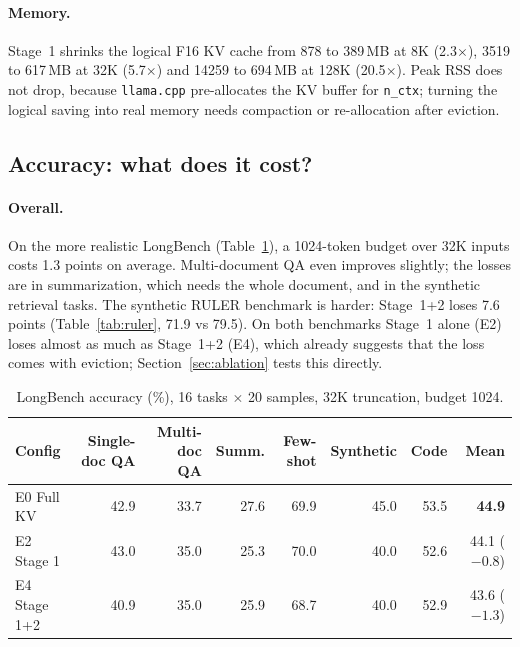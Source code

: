 \documentclass[10pt,letterpaper]{article}
\newcommand{\code}[1]{\texttt{#1}}
\newcommand{\best}[1]{\textbf{#1}}
\begin{document}
\paragraph{Memory.}
Stage~1 shrinks the logical F16 KV cache from 878 to 389\,MB at 8K (2.3$\times$), 3519 to 617\,MB at 32K (5.7$\times$) and 14259 to 694\,MB at 128K (20.5$\times$). Peak RSS does not drop, because \code{llama.cpp} pre-allocates the KV buffer for \code{n\_ctx}; turning the logical saving into real memory needs compaction or re-allocation after eviction.

\subsection{Accuracy: what does it cost?}
\label{sec:accuracy}

\paragraph{Overall.}
On the more realistic LongBench (Table~\ref{tab:longbench}), a 1024-token budget over 32K inputs costs 1.3 points on average. Multi-document QA even improves slightly; the losses are in summarization, which needs the whole document, and in the synthetic retrieval tasks. The synthetic RULER benchmark is harder: Stage~1+2 loses 7.6 points (Table~\ref{tab:ruler}, 71.9 vs 79.5). On both benchmarks Stage~1 alone (E2) loses almost as much as Stage~1+2 (E4), which already suggests that the loss comes with eviction; Section~\ref{sec:ablation} tests this directly.

\begin{table}[h]
\centering\small
\caption{LongBench accuracy (\%), 16 tasks $\times$ 20 samples, 32K truncation, budget 1024.}
\label{tab:longbench}
\begin{tabular}{lrrrrrrr}
\toprule
Config & Single-doc QA & Multi-doc QA & Summ. & Few-shot & Synthetic & Code & Mean \\
\midrule
E0 Full KV & 42.9 & 33.7 & 27.6 & 69.9 & 45.0 & 53.5 & \best{44.9} \\
E2 Stage 1 & 43.0 & 35.0 & 25.3 & 70.0 & 40.0 & 52.6 & 44.1 ($-0.8$) \\
E4 Stage 1+2 & 40.9 & 35.0 & 25.9 & 68.7 & 40.0 & 52.9 & 43.6 ($-1.3$) \\
\bottomrule
\end{tabular}
\end{table}
\end{document}
